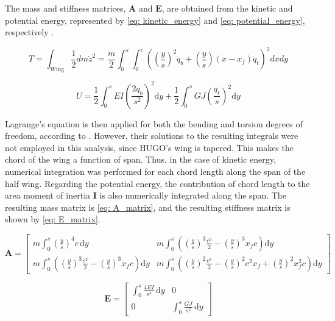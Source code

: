 The mass and stiffness matrices, $\mathbf{A}$ and $\mathbf{E}$, are obtained from the kinetic and potential energy, represented by \autoref{eq: kinetic_energy} and \autoref{eq: potential_energy}, respectively \cite{wright2008introduction}.

\begin{equation}
T = \int_{\text{Wing}} \frac{1}{2} dm \dot{z}^2 = \frac{m}{2} \int_{0}^{s} \int_{0}^{c} \left( \left(\frac{y}{s}\right)^2 \dot{q}_b + \left(\frac{y}{s}\right)(x - x_f) \dot{q}_t \right)^2 dx dy 
\label{eq: kinetic_energy}
\end{equation}

\begin{equation}
U = \frac{1}{2} \int_{0}^{s} EI \left(\frac{2q_b}{s^2}\right)^2 \mathrm{d}y + \frac{1}{2} \int_{0}^{s} GJ \left(\frac{q_t}{s}\right)^2 \mathrm{d}y
\label{eq: potential_energy}
\end{equation}

Lagrange's equation is then applied for both the bending and torsion degrees of freedom, according to \citeauthor{wright2008introduction} \cite{wright2008introduction}. However, their solutions to the resulting integrals were not employed in this analysis, since HUGO's wing is tapered. This makes the chord of the wing a function of span. Thus, in the case of kinetic energy, numerical integration was performed for each chord length along the span of the half wing. Regarding the potential energy, the contribution of chord length to the area moment of inertia $\mathbf{I}$ is also numerically integrated along the span. The resulting mass matrix is \autoref{eq: A_matrix}, and the resulting stiffness matrix is shown by \autoref{eq: E_matrix}.

\begin{equation}
\mathbf{A} = \begin{bmatrix} 
m \int_{0}^{s} \left(\frac{y}{s}\right)^4 c \, \mathrm{d}y & 
m \int_{0}^{s} \left( \left(\frac{y}{s}\right)^3 \frac{c^2}{2} - \left(\frac{y}{s}\right)^3 x_f c \right) \mathrm{d}y \\[1.5em]
m \int_{0}^{s} \left( \left(\frac{y}{s}\right)^3 \frac{c^2}{2} - \left(\frac{y}{s}\right)^3 x_f c \right) \mathrm{d}y & 
m \int_{0}^{s} \left( \left(\frac{y}{s}\right)^2 \frac{c^3}{3} - \left(\frac{y}{s}\right)^2 c^2 x_f + \left(\frac{y}{s}\right)^2 x_f^2 c \right) \mathrm{d}y 
\end{bmatrix}
\label{eq: A_matrix}
\end{equation}

\begin{equation}
\mathbf{E} = \begin{bmatrix} 
\int_{0}^{s} \frac{4EI}{s^4} \, \mathrm{d}y & 
0 \\[1.5em]
0 & 
\int_{0}^{s} \frac{GJ}{s^2} \, \mathrm{d}y 
\end{bmatrix}
\label{eq: E_matrix}
\end{equation}

